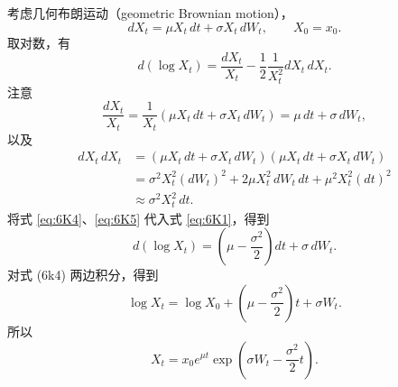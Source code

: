 考虑几何布朗运动（geometric Brownian motion），
\[
  dX_t=\mu X_t\,dt+\sigma X_t\,dW_t,\qquad X_0=x_0.
\]
取对数，有
\begin{equation*}
  d(\log X_t)=\frac{dX_t}{X_t}-\frac12\frac{1}{X_t^2}dX_t\,dX_t.
  \tag{6K3}\label{eq:6K3}
\end{equation*}
注意
\begin{equation*}
  \frac{dX_t}{X_t}=\frac{1}{X_t}(\mu X_t\,dt+\sigma X_t\,dW_t)
   =\mu\,dt+\sigma\,dW_t,
  \tag{6K4}\label{eq:6K4}
\end{equation*}
以及
\begin{equation*}
  \begin{aligned}
   dX_t\,dX_t
      &=(\mu X_t\,dt+\sigma X_t\,dW_t)(\mu X_t\,dt+\sigma X_t\,dW_t)\\
      &=\sigma^2 X_t^2(dW_t)^2+2\mu X_t^2\,dW_t\,dt+\mu^2X_t^2(dt)^2\\
      &\approx \sigma^2X_t^2\,dt.
  \end{aligned}
  \tag{6K5}\label{eq:6K5}
\end{equation*}
将式 \eqref{eq:6K4}、\eqref{eq:6K5} 代入式 \eqref{eq:6K1}，得到
\begin{equation*}
  d(\log X_t)=\left(\mu-\frac{\sigma^2}{2}\right)dt+\sigma\,dW_t.
  \tag{6K6}\label{eq:6K6}
\end{equation*}
对式 (6k4) 两边积分，得到
\[
  \log X_t=\log X_0+\left(\mu-\frac{\sigma^2}{2}\right)t+\sigma W_t.
\]
所以
\[
  X_t=x_0e^{\mu t}\exp\left(\sigma W_t-\frac{\sigma^2}{2}t\right).
\]
